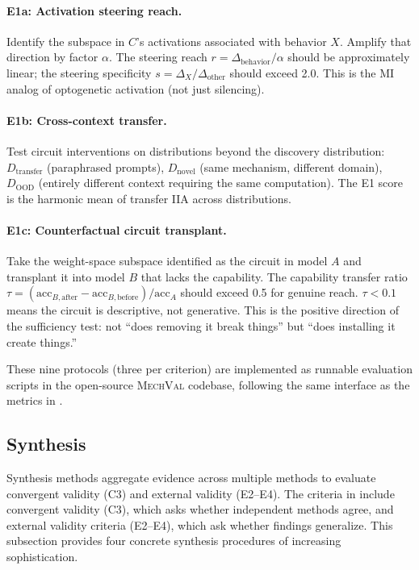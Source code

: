 \documentclass{article}
\newcommand{\mechval}{\textsc{MechVal}}
\begin{document}
\paragraph{E1a: Activation steering reach.} Identify the subspace in $C$'s activations associated with behavior $X$. Amplify that direction by factor $\alpha$. The steering reach $r = \Delta_{\text{behavior}} / \alpha$ should be approximately linear; the steering specificity $s = \Delta_X / \Delta_{\text{other}}$ should exceed 2.0. This is the MI analog of optogenetic activation (not just silencing).

\paragraph{E1b: Cross-context transfer.} Test circuit interventions on distributions beyond the discovery distribution: $D_{\text{transfer}}$ (paraphrased prompts), $D_{\text{novel}}$ (same mechanism, different domain), $D_{\text{OOD}}$ (entirely different context requiring the same computation). The E1 score is the harmonic mean of transfer IIA across distributions.

\paragraph{E1c: Counterfactual circuit transplant.} Take the weight-space subspace identified as the circuit in model $A$ and transplant it into model $B$ that lacks the capability. The capability transfer ratio $\tau = (\text{acc}_{B,\text{after}} - \text{acc}_{B,\text{before}}) / \text{acc}_A$ should exceed 0.5 for genuine reach. $\tau < 0.1$ means the circuit is descriptive, not generative. This is the positive direction of the sufficiency test: not ``does removing it break things'' but ``does installing it create things.''

These nine protocols (three per criterion) are implemented as runnable evaluation scripts in the open-source \mechval{} codebase, following the same interface as the metrics in .

\subsection{Synthesis}
\label{sec:methodology-synthesis}

Synthesis methods aggregate evidence across multiple methods to evaluate convergent validity (C3) and external validity (E2--E4). The criteria in  include convergent validity (C3), which asks whether independent methods agree, and external validity criteria (E2--E4), which ask whether findings generalize. This subsection provides four concrete synthesis procedures of increasing sophistication.
\end{document}
